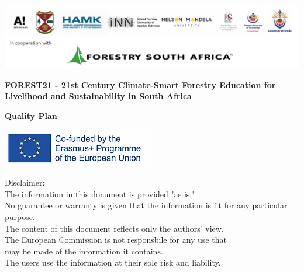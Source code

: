 \documentclass[
  11pt,
]{article}
\author{}
\date{\vspace{-2.5em}}
\begin{document}
\pagecolor{darkseagreen}

\subsectionfont{\raggedright}
\subsubsectionfont{\raggedright}

\thispagestyle{empty}

\begin{centering}

\vspace{3cm}


\includegraphics[width=1\linewidth]{Partner_logos} 

\vspace{3cm}

\Large
{\bf FOREST21 - 21st Century Climate-Smart Forestry Education for Livelihood
  and Sustainability in South Africa}
  
\vspace{2cm}

\Large
{\bf Quality Plan}

\vspace{4cm}

\normalsize
\singlespacing


\includegraphics[width=1\linewidth]{EU_logo} 

\vspace{0.5 cm}

Disclaimer:\\
The information in this document is provided "as is."\\
No guarantee or warranty is given that the information is fit for any particular purpose.\\
The content of this document reflects only the authors' view.\\
The European Commission is not responsbile for any use that\\
may be made of the information it contains.\\
The users use the information at their sole risk and liability.

\vspace{1.5 cm}

\end{centering}
\end{document}

